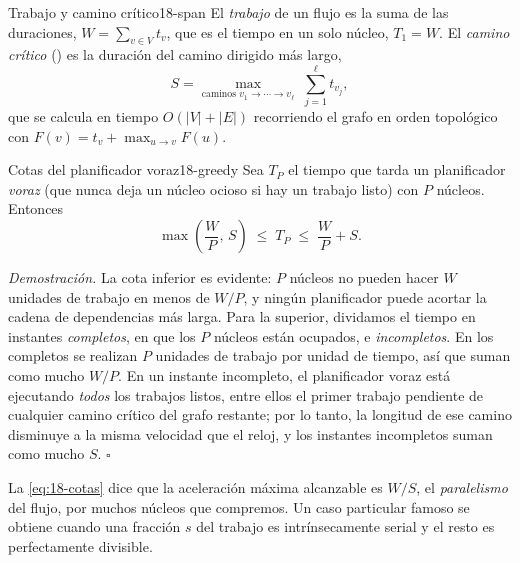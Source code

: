 \begin{definicion}{Trabajo y camino crítico}{18-span}
El \emph{trabajo} de un flujo es la suma de las duraciones, $W=\sum_{v\in V} t_v$, que es el tiempo en un solo núcleo, $T_1=W$. El \emph{camino crítico} () es la duración del camino dirigido más largo,
\begin{equation}\label{eq:18-span}
S = \max_{\text{caminos } v_1\to\cdots\to v_\ell}\;\sum_{j=1}^{\ell} t_{v_j},
\end{equation}
que se calcula en tiempo $O(|V|+|E|)$ recorriendo el grafo en orden topológico con $F(v)=t_v+\max_{u\to v}F(u)$.
\end{definicion}

\begin{simbolos}
\end{simbolos}

\begin{teorema}{Cotas del planificador voraz}{18-greedy}
Sea $T_P$ el tiempo que tarda un planificador \emph{voraz} (que nunca deja un núcleo ocioso si hay un trabajo listo) con $P$ núcleos. Entonces
\begin{equation}\label{eq:18-cotas}
\max\!\left(\frac{W}{P},\,S\right)\;\le\;T_P\;\le\;\frac{W}{P}+S.
\end{equation}
\end{teorema}

\emph{Demostración.} La cota inferior es evidente: $P$ núcleos no pueden hacer $W$ unidades de trabajo en menos de $W/P$, y ningún planificador puede acortar la cadena de dependencias más larga. Para la superior, dividamos el tiempo en instantes \emph{completos}, en que los $P$ núcleos están ocupados, e \emph{incompletos}. En los completos se realizan $P$ unidades de trabajo por unidad de tiempo, así que suman como mucho $W/P$. En un instante incompleto, el planificador voraz está ejecutando \emph{todos} los trabajos listos, entre ellos el primer trabajo pendiente de cualquier camino crítico del grafo restante; por lo tanto, la longitud de ese camino disminuye a la misma velocidad que el reloj, y los instantes incompletos suman como mucho $S$. \hfill$\square$

La \cref{eq:18-cotas} dice que la aceleración máxima alcanzable es $W/S$, el \emph{paralelismo} del flujo, por muchos núcleos que compremos. Un caso particular famoso se obtiene cuando una fracción $s$ del trabajo es intrínsecamente serial y el resto es perfectamente divisible.


